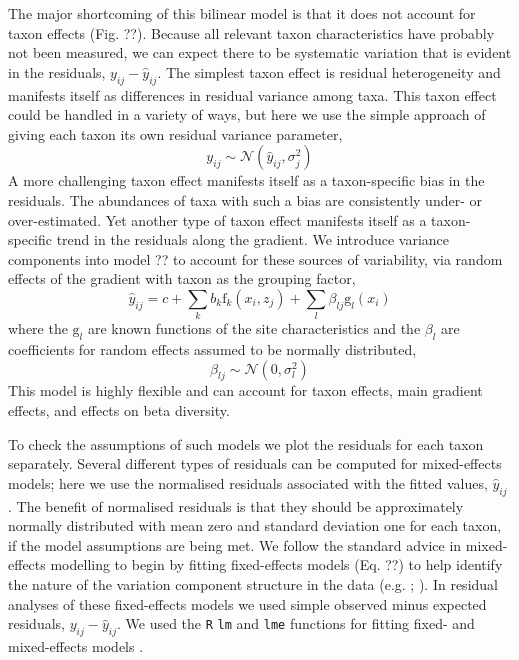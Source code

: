 \documentclass[12pt]{ecology}
\begin{document}
The major shortcoming of this bilinear model is that it does not account for taxon effects (Fig. ??).  Because all relevant taxon characteristics have probably not been measured, we can expect there to be systematic variation that is evident in the residuals, $y_{ij} - \hat{y}_{ij}$.  The simplest taxon effect is residual heterogeneity and manifests itself as differences in residual variance among taxa.  This taxon effect could be handled in a variety of ways, but here we use the simple approach of giving each taxon its own residual variance parameter,
\begin{equation}
y_{ij} \sim \mathcal{N}(\hat{y}_{ij},\sigma_j^2)
\end{equation}
A more challenging taxon effect manifests itself as a taxon-specific bias in the residuals.  The abundances of taxa with such a bias are consistently under- or over-estimated.  Yet another type of taxon effect manifests itself as a taxon-specific trend in the residuals along the gradient.  We introduce variance components into model ?? to account for these sources of variability, via random effects of the gradient with taxon as the grouping factor,
\begin{equation}
\hat{y}_{ij} = c + 
	\sum_k b_k \mathrm{f}_k (x_i, z_j) + 
	\sum_l \beta_{lj} \mathrm{g}_l (x_i)
\end{equation}
where the $\mathrm{g}_l$ are known functions of the site characteristics and the $\beta_l$ are coefficients for random effects assumed to be normally distributed,
\begin{equation}
\beta_{lj} \sim \mathcal{N}(0,\sigma_l^2)
\end{equation}
This model is highly flexible and can account for taxon effects, main gradient effects, and effects on beta diversity.

To check the assumptions of such models we plot the residuals for each taxon separately.  Several different types of residuals can be computed for mixed-effects models; here we use the normalised residuals associated with the fitted values, $\hat{y}_{ij}$ \citep{PinheiroAndBates2000}.  The benefit of normalised residuals is that they should be approximately normally distributed with mean zero and standard deviation one for each taxon, if the model assumptions are being met.  We follow the standard advice in mixed-effects modelling to begin by fitting fixed-effects models (Eq. ??) to help identify the nature of the variation component structure in the data (e.g. ; ).  In residual analyses of these fixed-effects models we used simple observed minus expected residuals, $y_{ij} - \hat{y}_{ij}$.  We used the \texttt{R} \texttt{lm} and \texttt{lme} functions for fitting fixed- and mixed-effects models \citep{R2009}.
\end{document}

